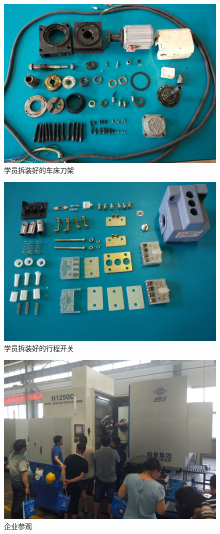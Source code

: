 \documentclass[12pt,a4paper]{ctexart}
\begin{document}
\begin{figure}[h]
	\begin{center}
		\includegraphics[width=0.8\linewidth]{image/5}
		\caption{学员拆装好的车床刀架 }
	\end{center}
\end{figure}

\begin{figure}[h]
	\begin{center}
		\includegraphics[width=0.8\linewidth]{image/6}
		\caption{学员拆装好的行程开关}
	\end{center}
\end{figure}

\begin{figure}[h]
	\begin{center}
		\includegraphics[width=0.8\linewidth]{image/7}
		\caption{企业参观 }
	\end{center}
\end{figure}
\end{document}
